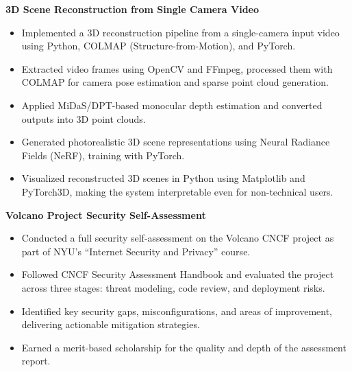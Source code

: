 \documentclass[12pt]{article}
\newcommand{\entry}[4]{{{\textbf{#1}}} \hfill #3 \\ #2 \hfill #4}
\begin{document}
\begin{paracol}{2}
\begin{flushleft}
			\entry{3D Scene Reconstruction from Single Camera Video}{}{}{}
			\vspace{-16pt}
			\begin{itemize}[noitemsep,topsep=0pt,leftmargin=3.5mm,rightmargin=0mm]
				\item Implemented a 3D reconstruction pipeline from a single-camera input video using Python, COLMAP (Structure-from-Motion), and PyTorch.
				\item Extracted video frames using OpenCV and FFmpeg, processed them with COLMAP for camera pose estimation and sparse point cloud generation.
				\item Applied MiDaS/DPT-based monocular depth estimation and converted outputs into 3D point clouds.
				\item Generated photorealistic 3D scene representations using Neural Radiance Fields (NeRF), training with PyTorch.
				\item Visualized reconstructed 3D scenes in Python using Matplotlib and PyTorch3D, making the system interpretable even for non-technical users.
			\end{itemize}
			
			
			\entry{Volcano Project Security Self-Assessment}{}{}{}
			\vspace{-16pt}
			\begin{itemize}[noitemsep,topsep=0pt,leftmargin=3.5mm,rightmargin=0mm]
				\item Conducted a full security self-assessment on the Volcano CNCF project as part of NYU’s “Internet Security and Privacy” course.
				\item Followed CNCF Security Assessment Handbook and evaluated the project across three stages: threat modeling, code review, and deployment risks.
				\item Identified key security gaps, misconfigurations, and areas of improvement, delivering actionable mitigation strategies.
				\item Earned a merit-based scholarship for the quality and depth of the assessment report.
			\end{itemize}
			

\end{flushleft}
\end{paracol}
\end{document}
